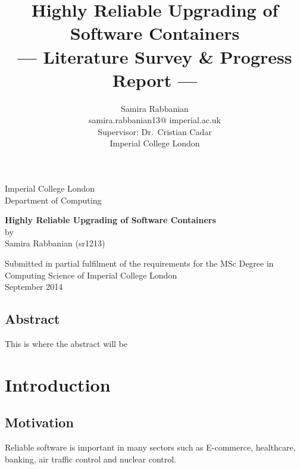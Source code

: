 \documentclass[a4paper,11pt,twoside]{report}
\title{Highly Reliable Upgrading of Software Containers\\\Large{--- Literature Survey \& Progress Report ---}}
\author{Samira Rabbanian\\
  samira.rabbanian13@ imperial.ac.uk \\
  \small{Supervisor: Dr.\ Cristian Cadar}\\
  \small{Imperial College London}}
\newcommand\blankpage{%
\null
\thispagestyle{empty}%
\addtocounter{page}{-1}%
\newpage}
\begin{document}
\maketitle

\begin{titlepage}
    \begin{center}
        \vspace*{2cm}
        
        \large
        {Imperial College London}\\
        \large
         \vspace*{0.2cm}
        {Department of Computing}
        
        \vspace{4.5 cm}
        \large
        {\Large \textbf{Highly Reliable Upgrading of Software Containers}}\\
        \vspace{1.0 cm}
        {by}\\
        {Samira Rabbanian (sr1213)}
        
        \vspace{10cm}
        

  	\large {Submitted in partial fulfilment of the requirements for the MSc Degree in Computing Science of Imperial College London }\\
  	
\vspace*{1 cm}  	
  \large{September 2014}\\ 
           
    \end{center}
\end{titlepage}
\afterpage{\blankpage}
\clearpage

\section*{Abstract}
This is where the abstract will be 
\clearpage


\tableofcontents
\clearpage

\listoffigures
\clearpage

\chapter{Introduction}
\section{Motivation}
Reliable software is important in many sectors such as E-commerce, healthcare, banking, air traffic control and nuclear control.
\end{document}
